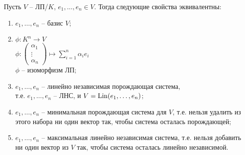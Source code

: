 \begin{theorem-non}
\end{theorem-non}
Пусть $V$ -- ЛП/$K$, $e_1, \dots, e_n \in V$.
Тогда следующие свойства эквивалентны:
\begin{enumerate}
    \item $e_1, \dots, e_n$ -- базис $V$;
    \item $\phi : K^n \to V$\\
    $\phi : \begin{pmatrix}
        \alpha_1 \\ \vdots \\ \alpha_n
    \end{pmatrix} \mapsto
    \sum \limits_{i=1}^n \alpha_i e_i$\\
    $\phi$ -- изоморфизм ЛП;
    \item $e_1, \dots, e_n$ -- линейно независимая порождающая система,\\
    т.е. $e_1, \dots, e_n$ -- ЛНС, и $V = \operatorname{Lin}(e_1, \dots, e_n)$;
    \item $e_1, \dots, e_n$ -- минимальная порождающая система для $V$,
    т.е. нельзя удалить из этого набора ни один вектор так, чтобы
    система осталась порождающей;
    \item $e_1, \dots, e_n$ -- максимальная линейно независимая система,
    т.е. нельзя добавить ни один вектор из $V$ так, чтобы система
    осталась линейно независимой.
\end{enumerate}
